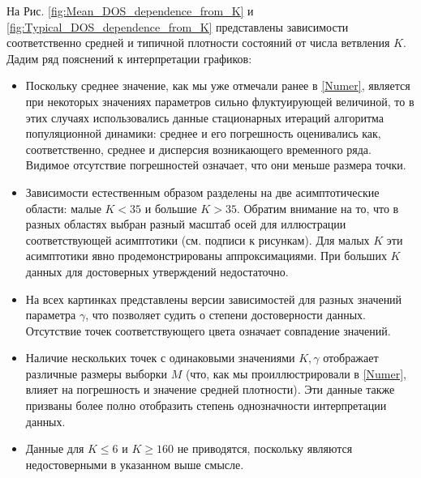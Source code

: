 На Рис. \ref{fig:Mean_DOS_dependence_from_K} и \ref{fig:Typical_DOS_dependence_from_K}  представлены зависимости соответственно средней и типичной плотности состояний от числа ветвления $K$. Дадим ряд пояснений к интерпретации графиков:
\begin{itemize}
	\item Поскольку среднее значение, как мы уже отмечали ранее в \autoref{Numer}, является при некоторых значениях параметров сильно флуктуирующей величиной, то в этих случаях использовались данные стационарных итераций алгоритма популяционной динамики: среднее и его погрешность оценивались как, соответственно, среднее и дисперсия возникающего временного ряда. Видимое отсутствие погрешностей означает, что они меньше размера точки.
	\item Зависимости естественным образом разделены на две асимптотические области: малые $K < 35$ и большие $K > 35$. Обратим внимание на то, что в разных областях выбран разный масштаб осей для иллюстрации соответствующей асимптотики (см. подписи к рисункам). Для малых $K$ эти асимптотики явно продемонстрированы аппроксимациями. При больших $K$ данных для достоверных утверждений недостаточно.
	\item На всех картинках представлены версии зависимостей для разных значений параметра $\gamma$, что позволяет судить о степени достоверности данных. Отсутствие точек соответствующего цвета означает совпадение значений.
	\item Наличие нескольких точек с одинаковыми значениями $K, \gamma$ отображает различные размеры выборки $M$ (что, как мы проиллюстрировали в \autoref{Numer}, влияет на погрешность и значение средней плотности). Эти данные также призваны более полно отобразить степень однозначности интерпретации данных.
	\item Данные для $K \le 6$ и $K \ge 160$ не приводятся, поскольку являются недостоверными в указанном выше смысле.
\end{itemize}

